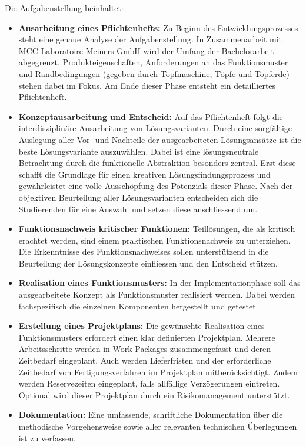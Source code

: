 Die Aufgabenstellung beinhaltet:
\begin{itemize}
	\item \textbf{Ausarbeitung eines Pflichtenhefts:} Zu Beginn des Entwicklungsprozesses steht eine genaue Analyse der Aufgabenstellung. In Zusammenarbeit mit MCC Laboratoire Meiners GmbH wird der Umfang der Bachelorarbeit abgegrenzt. Produkteigenschaften, Anforderungen an das Funktionsmuster und Randbedingungen (gegeben durch Topfmaschine, Töpfe und Topferde) stehen dabei im Fokus. Am Ende dieser Phase entsteht ein detailliertes Pflichtenheft.
	 
	\item \textbf{Konzeptausarbeitung und Entscheid:} Auf das Pflichtenheft folgt die interdisziplinäre Ausarbeitung von Lösungsvarianten. Durch eine sorgfältige Auslegung aller Vor- und Nachteile der ausgearbeiteten Lösungsansätze ist die beste Lösungsvariante auszuwählen. Dabei ist eine lösungsneutrale Betrachtung durch die funktionelle Abstraktion besonders zentral. Erst diese schafft die Grundlage für einen kreativen Lösungsfindungsprozess und gewährleistet eine volle Ausschöpfung des Potenzials dieser Phase. Nach der objektiven Beurteilung aller Lösungsvarianten entscheiden sich die Studierenden für eine Auswahl und setzen diese anschliessend um.
	
	\item \textbf{Funktionsnachweis kritischer Funktionen:} Teillösungen, die als kritisch erachtet werden, sind einem praktischen Funktionsnachweis zu unterziehen. Die Erkenntnisse des Funktionsnachweises sollen unterstützend in die Beurteilung der Lösungskonzepte einfliessen und den Entscheid stützen.
	
	\item \textbf{Realisation eines Funktionsmusters:} In der Implementationphase soll das ausgearbeitete Konzept als Funktionsmuster realisiert werden. Dabei werden fachspezifisch die einzelnen Komponenten hergestellt und getestet. 
	
	\item \textbf{Erstellung eines Projektplans:} Die gewünschte Realisation eines Funktionsmusters erfordert einen klar definierten Projektplan. Mehrere Arbeitsschritte werden in Work-Packages zusammengefasst und deren Zeitbedarf eingeplant. Auch  werden Lieferfristen und der erforderliche Zeitbedarf von Fertigungsverfahren im Projektplan mitberücksichtigt. Zudem werden Reservezeiten eingeplant, falls allfällige Verzögerungen eintreten. Optional wird dieser Projektplan durch ein Risikomanagement unterstützt.
	
	\item \textbf{Dokumentation:} Eine umfassende, schriftliche Dokumentation über die methodische Vorgehensweise sowie aller relevanten technischen Überlegungen ist zu verfassen. 
	
\end{itemize}